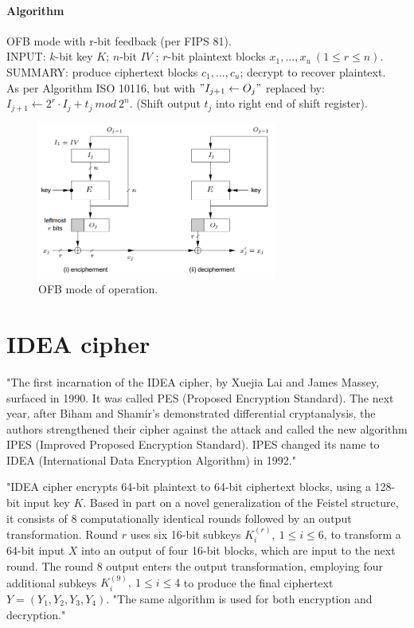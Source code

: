 \documentclass[a4paper,12pt,titlepage]{article}
\begin{document}
\paragraph{Algorithm}
OFB mode with r-bit feedback (per FIPS 81). \citep{menezes_handbook_1996} \\
INPUT: $k$-bit key $K$; $n$-bit $IV$ ; $r$-bit plaintext blocks $x_1, ... , x_u\ (1 \le r \le n)$. \\
SUMMARY: produce ciphertext blocks $c_1, ... , c_u$; decrypt to recover plaintext.\\
As per Algorithm ISO 10116, but with $"I_{j+1} \leftarrow O_j"$ replaced by:\\
$I_{j+1} \leftarrow 2^r \cdot I_j + t_j\ mod\ 2^n.$ (Shift output $t_j$ into right end of shift register).

\begin{figure}[!ht]
	\centering
	\label{fig:ofb}
	\includegraphics[width=0.7\textwidth]{ofb.png}
	\caption{OFB mode of operation. \citep{menezes_handbook_1996}}
\end{figure}

\section{IDEA cipher}

"The first incarnation of the IDEA cipher, by Xuejia Lai and James Massey, surfaced in 1990. It was called PES (Proposed Encryption Standard). The next year, after Biham and Shamir’s demonstrated differential cryptanalysis, the authors strengthened their cipher against the attack and called the new algorithm IPES (Improved Proposed Encryption Standard). IPES changed its name to IDEA (International Data Encryption Algorithm) in 1992." \citep{schneier_applied_1996}

"IDEA cipher encrypts 64-bit plaintext to 64-bit ciphertext blocks, using a 128-bit input key $K$. Based in part on a novel generalization of the Feistel structure, it consists of 8 computationally identical rounds followed by an output transformation. Round $r$ uses six 16-bit subkeys $K_{i}^{(r)},\ 1 \le i\le 6$, to transform a 64-bit input $X$ into an output of four 16-bit blocks, which are input to the next round. The round 8 output enters the output transformation, employing four additional subkeys $K_{i}^{(9)},\ 1 \le i \le 4$ to produce the final ciphertext $Y = (Y_1, Y_2, Y_3, Y_4)$. "The same algorithm is used for both encryption and decryption." \citep{schneier_applied_1996}
\end{document}
